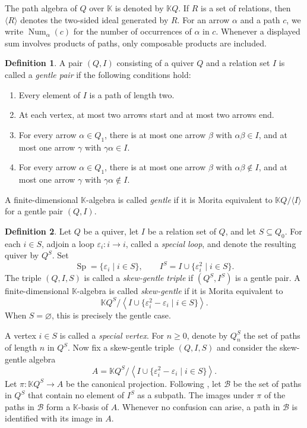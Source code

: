 \documentclass[11pt,a4paper,reqno]{amsart}
\newcommand{\mK}{\mathbb K}
\newcommand{\mB}{\mathcal B}
\newcommand{\Sp}{\operatorname{Sp}}
\newcommand{\num}[2]{\operatorname{Num}_{#1}(#2)}
\newcommand{\ep}{\varepsilon}
\theoremstyle{plain}
\theoremstyle{definition}
\newtheorem{definition}[definition]{Definition}
\numberwithin{equation}{section}
\begin{document}
	The path algebra of $Q$ over $\mK$ is denoted by $\mK Q$. If $R$ is a set of
	relations, then $\langle R\rangle$ denotes the two-sided ideal generated by
	$R$. For an arrow $\alpha$ and a path $c$, we write $\num{\alpha}{c}$ for
	the number of occurrences of $\alpha$ in $c$. Whenever a displayed sum
	involves products of paths, only composable products are included.
	
	\begin{definition}\label{def:gentle}
		A pair $(Q,I)$ consisting of a quiver $Q$ and a relation set $I$ is called a
		\emph{gentle pair} if the following conditions hold:
		\begin{enumerate}[label=\textup{(G\arabic*)}]
			\item Every element of $I$ is a path of length two.
			\item At each vertex, at most two arrows start and at most two arrows end.
			\item For every arrow $\alpha\in Q_1$, there is at most one arrow $\beta$
			with $\alpha\beta\in I$, and at most one arrow $\gamma$ with
			$\gamma\alpha\in I$.
			\item For every arrow $\alpha\in Q_1$, there is at most one arrow $\beta$
			with $\alpha\beta\notin I$, and at most one arrow $\gamma$ with
			$\gamma\alpha\notin I$.
		\end{enumerate}
		A finite-dimensional $\mK$-algebra is called \emph{gentle} if it is Morita
		equivalent to $\mK Q/\langle I\rangle$ for a gentle pair $(Q,I)$.
	\end{definition}
	
	\begin{definition}\label{def:finite-skew-gentle} 
		Let $Q$ be a quiver, let $I$ be a relation set of $Q$, and let $S\subseteq Q_0$.
		For each $i\in S$, adjoin a loop $\ep_i:i\to i$, called a
		\emph{special loop}, and denote the resulting quiver by $Q^S$.
		Set
		\[
		\Sp=\{\ep_i \mid i\in S\},
		\qquad
		I^S=I\cup\{\ep_i^2 \mid i\in S\}.
		\]
		The triple $(Q,I,S)$ is called a \emph{skew-gentle triple} if
		$(Q^S,I^S)$ is a gentle pair. A finite-dimensional $\mK$-algebra is called \emph{skew-gentle} if it is Morita equivalent to
		\[
		\mK Q^S/
		\left\langle
		I\cup\{\ep_i^2-\ep_i \mid i\in S\}
		\right\rangle.
		\]
		When $S=\varnothing$, this is precisely the gentle case. 
	\end{definition}
	
	A vertex $i\in S$ is called a \emph{special vertex}. 
	For $n\geq0$, denote by $Q_n^S$ the set of paths of length $n$ in $Q^S$.
	Now fix a skew-gentle triple $(Q,I,S)$ and consider the skew-gentle algebra 
	\[
	A=\mK Q^S/
	\left\langle
	I\cup\{\ep_i^2-\ep_i \mid i\in S\}
	\right\rangle.
	\]
	Let $\pi:\mK Q^S\longrightarrow A$ be the canonical projection. Following
	\cite[Section~2.1]{BSSWW26}, let $\mB$ be the set of paths in $Q^S$ that
	contain no element of $I^S$ as a subpath. The images under $\pi$ of the
	paths in $\mB$ form a $\mK$-basis of $A$. Whenever no confusion can arise,
	a path in $\mB$ is identified with its image in $A$.
\end{document}
